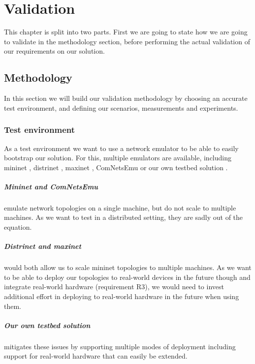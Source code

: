\chapter{Validation}
\label{validation}

This chapter is split into two parts. First we are going to state how we are going to validate in the methodology section, before performing the actual validation of our requirements on our solution.

\section{Methodology}
\label{validation_methodology}
In this section we will build our validation methodology by choosing an accurate test environment, and defining our scenarios, measurements and experiments.

\subsection{Test environment}
As a test environment we want to use a network emulator to be able to easily bootstrap our solution. For this, multiple emulators are available, including mininet \cite{mininet}, distrinet \cite{distrinet1, distrinet2}, maxinet \cite{maxinet}, ComNetsEmu \cite{comnetsemu} or our own testbed solution \cite{owntb}.

\paragraph{Mininet and ComNetsEmu} emulate network topologies on a single machine, but do not scale to multiple machines. As we want to test in a distributed setting, they are sadly out of the equation.

\paragraph{Distrinet and maxinet} would both allow us to scale mininet topologies to multiple machines. As we want to be able to deploy our topologies to real-world devices in the future though and integrate real-world hardware (requirement R3), we would need to invest additional effort in deploying to real-world hardware in the future when using them.

\paragraph{Our own testbed solution} mitigates these issues by supporting multiple modes of deployment including support for real-world hardware that can easily be extended.

